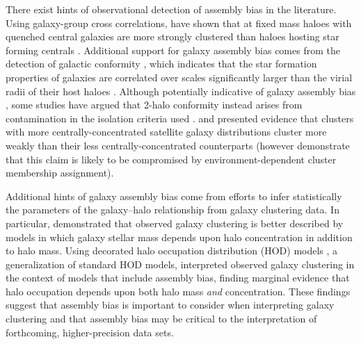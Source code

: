 \documentclass[usenatbib,fleqn]{mnras}
\begin{document}
There exist hints of observational detection of assembly bias in the literature. Using galaxy-group cross correlations, \citet{Yang_etal06} have shown that at fixed mass haloes with quenched central galaxies are more strongly clustered than haloes hosting star forming centrals \citep[see also][]{blanton_berlind07, wang_etal08, wang_etal13}. Additional support for galaxy assembly bias comes from the detection of galactic conformity \citep{weinmann_etal06}, which indicates that the star formation properties of galaxies are correlated over scales significantly larger than the virial radii of their host haloes \citep[2-halo conformity][]{kauffmann_etal13,kawinwan_etal16,berti_etal17}. Although potentially indicative of galaxy assembly bias \citep[e.g.,][]{hearin_etal15,hearin_etal16}, some studies have argued that 2-halo conformity instead arises from contamination in the isolation criteria used \citep{tinker_etal17, sin_etal17}. \citet{miyatake_etal16} and \citet{more_etal16} presented  evidence that clusters with more centrally-concentrated satellite galaxy distributions cluster more weakly than  their less centrally-concentrated counterparts (however \citealt{zu_mandelbaum16} demonstrate that this claim is likely to be compromised by environment-dependent cluster membership assignment). 

Additional hints of galaxy assembly bias come from efforts to infer statistically the parameters of the galaxy--halo relationship from galaxy clustering data. In particular, \citet{lehmann_etal17} demonstrated that observed galaxy clustering is better described by models in which galaxy stellar mass depends upon halo concentration in addition to halo mass. Using decorated halo occupation distribution (HOD) models \citep{hearin_etal16}, a generalization of standard HOD models, \citet{zentner_etal16} interpreted observed galaxy clustering in the context of models that include assembly bias, finding marginal evidence that halo occupation depends upon both halo mass {\em and} concentration. These findings suggest that assembly bias is important to consider when interpreting galaxy clustering and that assembly bias may be critical to the interpretation of forthcoming, higher-precision data sets.
\end{document}
